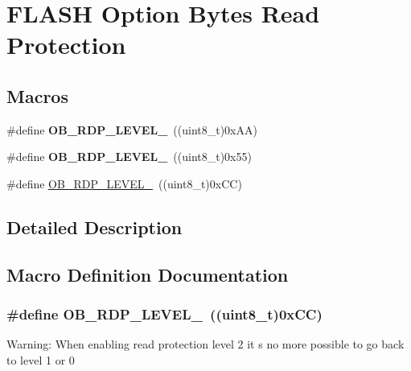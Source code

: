 \hypertarget{group___f_l_a_s_h_ex___option___bytes___read___protection}{}\section{F\+L\+A\+SH Option Bytes Read Protection}
\label{group___f_l_a_s_h_ex___option___bytes___read___protection}
\subsection*{Macros}
\begin{DoxyCompactItemize}
\item 
\#define {\bfseries O\+B\+\_\+\+R\+D\+P\+\_\+\+L\+E\+V\+E\+L\+\_}~((uint8\+\_\+t)0x\+A\+A)\hypertarget{group___f_l_a_s_h_ex___option___bytes___read___protection_ga22c7871bda267a2844ab9ca9f7bd38e4}{}\label{group___f_l_a_s_h_ex___option___bytes___read___protection_ga22c7871bda267a2844ab9ca9f7bd38e4}

\item 
\#define {\bfseries O\+B\+\_\+\+R\+D\+P\+\_\+\+L\+E\+V\+E\+L\+\_}~((uint8\+\_\+t)0x55)\hypertarget{group___f_l_a_s_h_ex___option___bytes___read___protection_ga778207f0d12d87bbff9d55e985aba5bc}{}\label{group___f_l_a_s_h_ex___option___bytes___read___protection_ga778207f0d12d87bbff9d55e985aba5bc}

\item 
\#define \hyperlink{group___f_l_a_s_h_ex___option___bytes___read___protection_ga2262afca565429ce2808d835c49e5ee6}{O\+B\+\_\+\+R\+D\+P\+\_\+\+L\+E\+V\+E\+L\+\_}~((uint8\+\_\+t)0x\+C\+C)
\end{DoxyCompactItemize}


\subsection{Detailed Description}


\subsection{Macro Definition Documentation}
\subsubsection[{\texorpdfstring{O\+B\+\_\+\+R\+D\+P\+\_\+\+L\+E\+V\+E\+L\+\_\+2}{OB_RDP_LEVEL_2}}]{\setlength{\rightskip}{0pt plus 5cm}\#define O\+B\+\_\+\+R\+D\+P\+\_\+\+L\+E\+V\+E\+L\+\_~((uint8\+\_\+t)0x\+C\+C)}\hypertarget{group___f_l_a_s_h_ex___option___bytes___read___protection_ga2262afca565429ce2808d835c49e5ee6}{}\label{group___f_l_a_s_h_ex___option___bytes___read___protection_ga2262afca565429ce2808d835c49e5ee6}
Warning\+: When enabling read protection level 2 it s no more possible to go back to level 1 or 0 